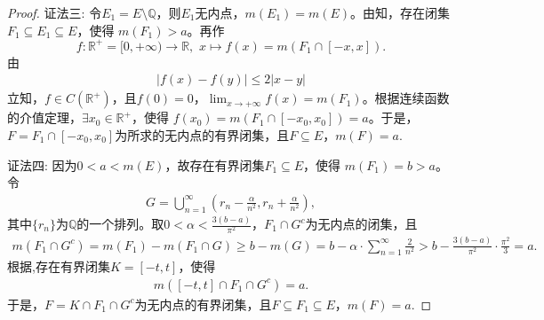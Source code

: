 \documentclass[../../main.tex]{subfiles}%
\begin{document}
\begin{proof}
{\color{blue}证法三:} 令$E_1=E\setminus\mathbb{Q}$，则$E_1$无内点，$m(E_1)=m(E)$。由知，存在闭集$F_1\subseteq E_1\subseteq E$，使得 $m(F_1)>a$。再作
$$
f:\mathbb{R}^+=[0,+\infty)\to\mathbb{R},\,\,x\mapsto f(x)=m(F_1\cap[-x,x]).
$$
由
\begin{align*}
|f(x)-f(y)| \leqslant 2|x-y|
\end{align*}
立知，$f\in C(\mathbb{R}^+)$，且$f(0)=0$，$\lim_{x\to+\infty} f(x)=m(F_1)$。根据连续函数的介值定理，$\exists x_0\in\mathbb{R}^+$，使得 $f(x_0)=m(F_1\cap[-x_0,x_0])=a$。于是，$F=F_1\cap[-x_0,x_0]$为所求的无内点的有界闭集，且$F\subseteq E$，$m(F)=a$.

{\color{blue}证法四:} 因为$0<a<m(E)$，故存在有界闭集$F_1\subseteq E$，使得 $m(F_1)=b>a$。令
\begin{align*}
G = \bigcup\limits_{n=1}^{\infty} \left(r_n - \frac{\alpha}{n^2}, r_n + \frac{\alpha}{n^2}\right),
\end{align*}
其中$\{r_n\}$为$\mathbb{Q}$的一个排列。取$0<\alpha<\frac{3(b-a)}{\pi^2}$，$F_1\cap G^c$为无内点的闭集，且
\begin{align*}
m(F_1\cap G^c) = m(F_1) - m(F_1\cap G) 
\geqslant b - m(G) = b - \alpha \cdot \sum\limits_{n=1}^{\infty} \frac{2}{n^2} 
> b - \frac{3(b-a)}{\pi^2} \cdot \frac{\pi^2}{3} = a.
\end{align*}
根据,存在有界闭集$K=[-t,t]$，使得
\begin{align*}
m([-t,t]\cap F_1\cap G^c) = a.
\end{align*}
于是，$F=K\cap F_1\cap G^c$为无内点的有界闭集，且$F\subseteq F_1\subseteq E$，$m(F)=a$.

\end{proof}
\end{document}

